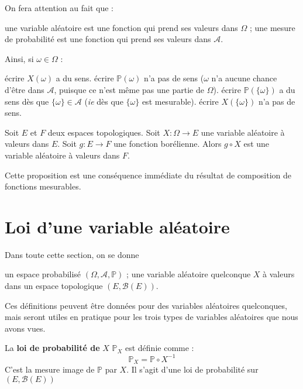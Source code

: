 \documentclass[../integ-proba.tex]{subfiles}
\begin{document}
\begin{rem}
    On fera attention au fait que :
    \begin{itemize}
        \itemb une variable aléatoire est une fonction qui prend ses valeurs dans $\Omega$ ;
        \itemb une mesure de probabilité est une fonction qui prend ses valeurs dans $\mathcal{A}$.
    \end{itemize}
    Ainsi, si $\omega \in \Omega$ :
    \begin{itemize}
        \itemb écrire $X(\omega)$ a du sens.
        \itemb écrire $\mathbb{P}(\omega)$ n'a pas de sens ($\omega$ n'a aucune chance d'être dans $\mathcal{A}$, puisque ce n'est même pas une partie de $\Omega$).
        \itemb écrire $\mathbb{P}(\{\omega\})$ a du sens dès que $\{\omega\}\in \mathcal{A}$ (\textit{ie} dès que $\{\omega\}$ est mesurable).
        \itemb écrire $X(\{\omega\})$ n'a pas de sens.
    \end{itemize}
\end{rem}

\begin{prop}
    \label{prop:composition_var_bor}
    Soit $E$ et $F$ deux espaces topologiques.
    Soit $X:\Omega \longrightarrow E$ une variable aléatoire à valeurs dans $E$.
    Soit $g:E \longrightarrow F$ une fonction borélienne.
    Alors $g \circ X$ est une variable aléatoire à valeurs dans $F$.
\end{prop}

\begin{rem}
    Cette proposition est une conséquence immédiate du résultat de composition de fonctions mesurables.
\end{rem}

\section{Loi d'une variable aléatoire}

Dans toute cette section, on se donne
\begin{itemize}
    \itemb un espace probabilisé $\left(\Omega, \mathcal{A}, \mathbb{P}\right)$ ;
    \itemb une variable aléatoire quelconque $X$ à valeurs dans un espace topologique $\left(E, \mathcal{B}(E)\right)$.
\end{itemize}

Ces définitions peuvent être données pour des variables aléatoires quelconques, mais seront utiles en pratique pour les trois types de variables aléatoires que nous avons vues.

\begin{defi}
    La \textbf{loi de probabilité de} $X$ $\mathbb{P}_X$ est définie comme :
    $$
    \mathbb{P}_X=\mathbb{P} \circ X^{-1}
    $$
    C'est la mesure image de $\mathbb{P}$ par $X$.
    Il s'agit d'une loi de probabilité sur $\left(E, \mathcal{B}(E) \right)$
\end{defi}
\end{document}
